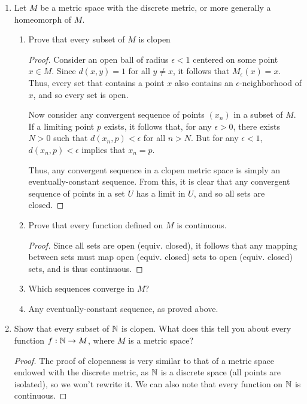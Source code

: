 \documentclass[11pt, a4paper, latinreim, shortsets]{notes}
\begin{document}
\begin{enumerate}[label={\bfseries 2.\arabic*}]
\begin{proof}
		Now, for any closed set $V$ in $M$, there exists an open set $M - V$ such that
		$f(M-V) = M-(M-V) = V$. Thus $f$ is surjective as well, and so bijective, too.
	\end{proof}

	\item Let $M$ be a metric space with the discrete metric, or more generally a
	homeomorph of $M$.

	\begin{enumerate}[label=\alph*)]
	\item Prove that every subset of $M$ is clopen
	\begin{proof}
		Consider an open ball of radius $\epsilon < 1$ centered on some point $x \in M$.
		Since $d(x,y) = 1$ for all $y\neq x$, it follows that $M_\epsilon(x) = x$.
			Thus, every set that contains a point $x$ also contains an $\epsilon$-neighborhood of $x$,
			and so every set is open.

			Now consider any convergent sequence of points $(x_n)$ in a subset of $M$.
			If a limiting point $p$ exists, it follows that, for any $\epsilon > 0$, there exists
			$N > 0$ such that $d(x_n,p) < \epsilon$ for all $n > N$. But for any $\epsilon < 1$,
			$d(x_n, p)< \epsilon$ implies that $x_n = p$.

			Thus, any convergent sequence in a clopen metric space is simply an eventually-constant
			sequence. From this, it is clear that any convergent sequence of points in a set $U$
			has a limit in $U$, and so all sets are closed.
	\end{proof}
	\item Prove that every function defined on $M$ is continuous.
			\begin{proof}
				Since all sets are open (equiv. closed), it follows that any mapping between sets must
				map open (equiv. closed) sets to open (equiv. closed) sets, and is thus continuous.
			\end{proof}
	\item Which sequences converge in $M$?
			\item[] Any eventually-constant sequence, as proved above.
	\end{enumerate}

	\item Show that every subset of $\mathbb{N}$ is clopen. What does this tell you about every
	function $f : \mathbb{N} \rightarrow M$, where $M$ is a metric space?

	\begin{proof}
		The proof of clopenness is very similar to that of a metric space endowed with the discrete
		metric, as $\mathbb{N}$ is a discrete space (all points are isolated), so we won't rewrite it.
		We can also note that every function on $\mathbb{N}$ is continuous.
	\end{proof}


\end{enumerate}
\end{document}
